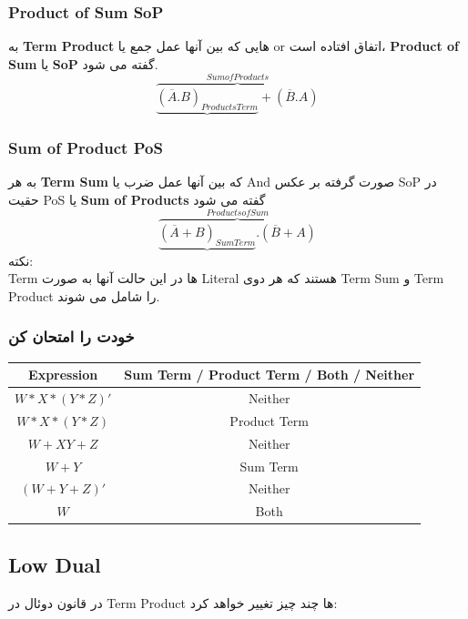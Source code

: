 \documentclass[pt, a5paper]{article}
\begin{document}
\raggedleft
\justifying
\subsubsection{Product of Sum SoP}
	به \textbf{Term Product }هایی که بین آنها عمل جمع یا or اتفاق افتاده است، \textbf{Product of Sum }یا \textbf{SoP} گفته می شود.\\

\begin{equation}
	\overbrace{\underbrace{(\overline{A}.B)_{Products Term}} + (\overline{B}.A)}^{Sum of Products}
\end{equation}

\subsubsection{Sum of Product PoS}
	به هر \textbf{Term Sum} که بین آنها عمل ضرب یا And صورت گرفته بر عکس	 SoP در حقیت PoS یا\textbf{ Sum of Products }گفته می شود\\
\begin{equation}
	\overbrace{\underbrace{(\overline{A}+B)_{Sum Term}} . (\overline{B}+A)}^{Products of Sum}
\end{equation}
نکته:\\

	Term
ها
در این حالت آنها به صورت Literal هستند که هر دوی Term Sum و Term Product را شامل می شوند.

\newpage

\subsubsection{خودت را امتحان کن}
\center
\begin{LTR}
	\begin{tabular}{ c | c}
		Expression & Sum Term / Product Term / Both / Neither \\
		\hline
		$W*X*(Y*Z)'$ & Neither\\
		$W*X*(Y*Z)$ & Product Term\\
		$W+XY+Z$ & Neither\\
		$W+Y$ & Sum Term\\
		$(W+Y+Z)'$ & Neither\\
		$W$ & Both\\
	\end{tabular}

\end{LTR}

\raggedleft
\justifying
\subsection{Low Dual}
در قانون دوئال در Term Product ها چند چیز تغییر خواهد کرد:\\
\end{document}
